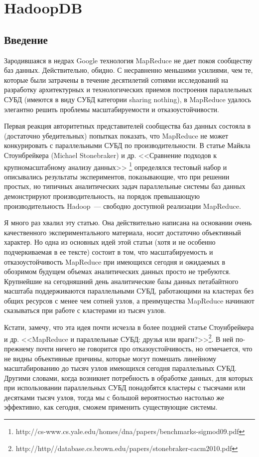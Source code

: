 \section{HadoopDB}
\subsection{Введение}
Зародившаяся в недрах Google технология MapReduce не дает покоя сообществу баз данных. Действительно, обидно. 
С несравненно меньшими усилиями, чем те, которые были затрачены в течение десятилетий сотнями исследований на 
разработку архитектурных и технологических приемов построения параллельных СУБД (имеются в виду СУБД категории 
sharing nothing), в MapReduce удалось элегантно решить проблемы масштабируемости и отказоустойчивости. 

Первая реакция авторитетных представителей сообщества баз данных состояла в (достаточно убедительных) попытках показать, 
что MapReduce не может конкурировать с параллельными СУБД по производительности. В статье Майкла Стоунбрейкера 
(Michael Stonebraker) и др. 
<<Сравнение подходов к крупномасштабному анализу данных>>
\footnote{http://cs-www.cs.yale.edu/homes/dna/papers/benchmarks-sigmod09.pdf} 
определялся тестовый набор 
и описывались результаты экспериментов, показывающие, что при решении простых, но типичных аналитических задач 
параллельные системы баз данных демонстрируют производительность, на порядок превышающую производительность 
Hadoop~--- свободно доступной реализации MapReduce.

Я много раз хвалил эту статью. Она действительно написана на основании очень качественного экспериментального материала, 
носит достаточно объективный характер. Но одна из основных идей этой статьи (хотя и не особенно подчеркиваемая в ее 
тексте) состоит в том, что масштабируемость и отказоустойчивость MapReduce при имеющихся сегодня и ожидаемых в 
обозримом будущем объемах аналитических данных просто не требуются. Крупнейшие на сегодняшний день аналитические базы 
данных петабайтного масштаба поддерживаются параллельными СУБД, работающими на кластерах без общих ресурсов с менее 
чем сотней узлов, а преимущества MapReduce начинают сказываться при работе с кластерами из тысяч узлов.

Кстати, замечу, что эта идея почти исчезла в более поздней статье Стоунбрейкера и др. <<MapReduce и параллельные СУБД: 
друзья или враги?>>\footnote{http://http//database.cs.brown.edu/papers/stonebraker-cacm2010.pdf}. 
В ней по-прежнему почти ничего не говорится про отказоустойчивость, но отмечается, что не видны 
объективные причины, которые могут помешать линейному масштабированию до тысяч узлов имеющихся сегодня параллельных 
СУБД. Другими словами, когда возникнет потребность в обработке данных, для которых при использовании параллельных 
СУБД понадобятся кластеры с тысячами или десятками тысяч узлов, тогда мы с большой вероятностью настолько же эффективно, 
как сегодня, сможем применить существующие системы.

